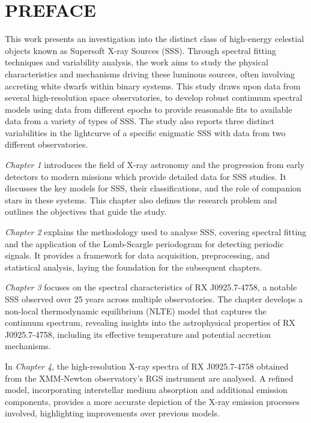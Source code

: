 \chapter*{PREFACE}
    \def\baselinestretch{1.0}
    This work presents an investigation into the distinct class of high-energy celestial objects known as Supersoft X-ray Sources (SSS). Through spectral fitting techniques and variability analysis, the work aims to study the physical characteristics and mechanisms driving these luminous sources, often involving accreting white dwarfs within binary systems. This study draws upon data from several high-resolution space observatories, to develop robust continuum spectral models using data from different epochs to provide reasonable fits to available data from a variety of types of SSS. The study also reports three distinct variabilities in the lightcurve of a specific enigmatic SSS with data from two different observatories.
    
    \textit{Chapter 1} introduces the field of X-ray astronomy and the progression from early detectors to modern missions which provide detailed data for SSS studies. It discusses the key models for SSS, their classifications, and the role of companion stars in these systems. This chapter also defines the research problem and outlines the objectives that guide the study.
    
    \textit{Chapter 2} explains the methodology used to analyse SSS, covering spectral fitting and the application of the Lomb-Scargle periodogram for detecting periodic signals. It provides a framework for data acquisition, preprocessing, and statistical analysis, laying the foundation for the subsequent chapters.
    
    \textit{Chapter 3} focuses on the spectral characteristics of RX J0925.7-4758, a notable SSS observed over 25 years across multiple observatories. The chapter develops a non-local thermodynamic equilibrium (NLTE) model that captures the continuum spectrum, revealing insights into the astrophysical properties of RX J0925.7-4758, including its effective temperature and potential accretion mechanisms.
    
    In \textit{Chapter 4}, the high-resolution X-ray spectra of RX J0925.7-4758 obtained from the XMM-Newton observatory's RGS instrument are analysed. A refined model, incorporating interstellar medium absorption and additional emission components, provides a more accurate depiction of the X-ray emission processes involved, highlighting improvements over previous models.
    
